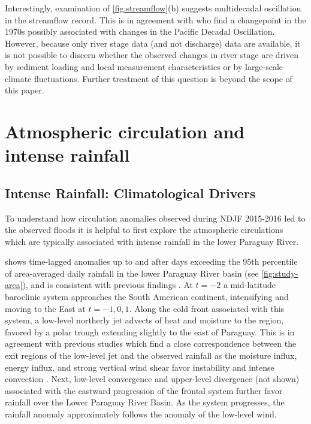 \documentclass[twocol]{ametsoc}
\begin{document}
Interestingly, examination of \cref{fig:streamflow}(b) suggests multidecadal oscillation in the streamflow record.
This is in agreement with \citet{Collischonn:2001bi,Carvalho2011} who find a changepoint in the 1970s possibly associated with changes in the Pacific Decadal Oscillation.
However, because only river stage data (and not discharge) data are available, it is not possible to discern whether the observed changes in river stage are driven by sediment loading and local measurement characteristics or by large-scale climate fluctuations. Further treatment of this question is beyond the scope of this paper.


\section{Atmospheric circulation and intense rainfall} \label{sec:diagnostics}

\subsection{Intense Rainfall: Climatological Drivers} \label{sec:rainfall-circulation}

To understand how circulation anomalies observed during NDJF 2015-2016 led to the observed floods it is helpful to first explore the atmospheric circulations which are typically associated with intense rainfall in the lower Paraguay River.

 shows time-lagged anomalies up to and after days exceeding the 95th percentile of area-averaged daily rainfall in the lower Paraguay River basin (see \cref{fig:study-area}), and is consistent with previous findings \citep{Marengo2004,Salio:2007gd}.
At $t=-2$ a mid-latitude baroclinic system approaches the South American continent, intensifying and moving to the East at $t=-1,0,1$.
Along the cold front associated with this system, a low-level northerly jet advects of heat and moisture to the region, favored by a polar trough extending slightly to the east of Paraguay.
This is in agreement with previous studies which find a close correspondence between the exit regions of the low-level jet and the observed rainfall \citep{Saulo:2007km,Salio:2007gd,Marengo2004,Velasco1987} as the moisture influx, energy influx, and strong vertical wind shear favor instability and intense convection \citep{Marengo2004,Silva2009}.
Next, low-level convergence and upper-level divergence (not shown) associated with the eastward progression of the frontal system further favor rainfall over the Lower Paraguay River Basin.
As the system progresses, the rainfall anomaly approximately follows the anomaly of the low-level wind.
\end{document}
